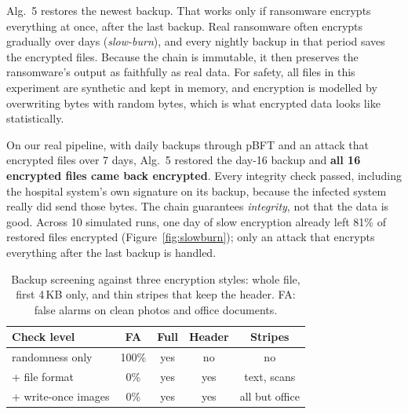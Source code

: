 \documentclass[11pt]{article}
\begin{document}
Alg.~5 restores the newest backup. That works only if ransomware encrypts everything at once,
after the last backup. Real ransomware often encrypts gradually over days
(\emph{slow-burn}), and every nightly backup in that period saves the encrypted files. Because the
chain is immutable, it then preserves the ransomware's output as faithfully as real data. For
safety, all files in this experiment are synthetic and kept in memory, and encryption is modelled
by overwriting bytes with random bytes, which is what encrypted data looks like statistically.

On our real pipeline, with daily backups through pBFT and an attack that encrypted files over 7
days, Alg.~5 restored the day-16 backup and \textbf{all 16 encrypted files came back encrypted}.
Every integrity check passed, including the hospital system's own signature on its backup, because
the infected system really did send those bytes. The chain guarantees \emph{integrity}, not that
the data is good. Across 10 simulated runs, one day of slow encryption already left 81\% of
restored files encrypted (Figure~\ref{fig:slowburn}); only an attack that encrypts everything after
the last backup is handled.

\begin{table}[t]
\centering
\small
\begin{tabular}{@{}lcccc@{}}
\toprule
\textbf{Check level} & \textbf{FA} & \textbf{Full} & \textbf{Header} & \textbf{Stripes} \\
\midrule
randomness only & 100\% & yes & no & no \\
+ file format & 0\% & yes & yes & text, scans \\
+ write-once images & 0\% & yes & yes & all but office \\
\bottomrule
\end{tabular}
\caption{Backup screening against three encryption styles: whole file, first 4\,KB only, and thin
stripes that keep the header. FA: false alarms on clean photos and office documents.}
\label{tab:screen}
\end{table}
\end{document}
